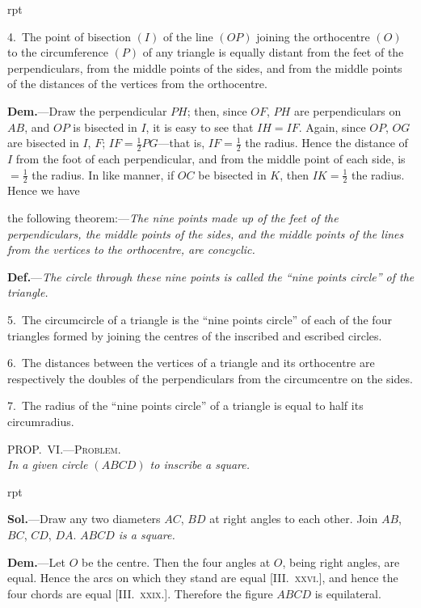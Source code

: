 \documentclass[oneside]{book}
\newcounter{wrapwidth}
\newcommand\myprop[2]{
\bigskip\Needspace*{4\baselineskip}\begin{center}\textsc{#1}\\\medskip\emph{#2}\par\end{center}
}
\newcommand\imgflow[3]{
\setcounter{wrapwidth}{#1}

\begin{wrapfigure}[#2]{r}{\value{wrapwidth}pt}
\begin{center}
\vspace{-0.3in}

\end{center}
\end{wrapfigure}
}
\begin{document}
\begin{footnotesize}
\imgflow{145}{16}{f159}

4.~The point of bisection $(I)$\label{bisection1} of the line $(OP)$ joining the orthocentre
$(O)$ to the circumference $(P)$
of any triangle is equally distant
from the feet of the perpendiculars,
from the middle points of
the sides, and from the middle
points of the distances of the vertices
from the orthocentre.

\textbf{Dem.}---Draw the perpendicular
$PH$; then, since $OF$, $PH$ are
perpendiculars on $AB$, and $OP$ is
bisected in $I$, it is easy to see that
$IH = IF$. Again, since $OP$, $OG$
are bisected in $I$, $F$; $IF = \frac{1}{2}PG$---that
is, $IF = \frac{1}{2}$ the radius. Hence
the distance of $I$ from the foot of each perpendicular, and from
the middle point of each side, is $= \frac{1}{2}$ the radius. In like manner,
if $OC$ be bisected in $K$, then $IK = \frac{1}{2}$ the radius. Hence we have

the following theorem:---\emph{The nine points made up of the feet of the
perpendiculars, the middle points of the sides, and the middle points
of the lines from the vertices to the orthocentre, are concyclic.}

\textbf{Def.}---\emph{The circle through these nine points is called the ``nine
points circle'' of the triangle.}

5.~The circumcircle of a triangle is the ``nine points circle''
of each of the four triangles formed by joining the centres of the
inscribed and escribed circles.

6.~The distances between the vertices of a triangle and its
orthocentre are respectively the doubles of the perpendiculars
from the circumcentre on the sides.

7.~The radius of the ``nine points circle'' of a triangle is equal
to half its circumradius.
\par\end{footnotesize}

\myprop{PROP\@.~VI\@.---Problem.}{In a given circle $(ABCD)$ to inscribe a square.}


\imgflow{120}{10}{f160}

\textbf{Sol.}---Draw any two diameters $AC$, $BD$ at right
angles to each other. Join $AB$,
$BC$, $CD$, $DA$. \emph{$ABCD$ is a square.}

\textbf{Dem.}---Let $O$ be the centre.
Then the four angles at $O$, being
right angles, are equal. Hence
the arcs on which they stand are
equal [\textsc{III\@.~xxvi.}], and hence the
four chords are equal [\textsc{III\@.~xxix.}].
Therefore the figure $ABCD$ is
equilateral.
\end{document}

